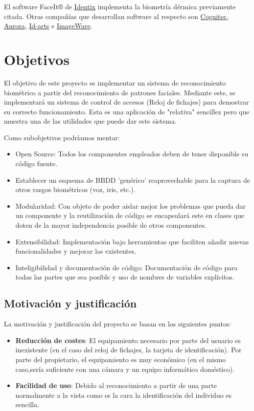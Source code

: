El software FaceIt® de \href{http://www.l1id.com/}{Identix} implementa la biometría dérmica previamente citada. Otras compañías que desarrollan software al respecto son \href{http://www.cognitec.com}{Cognitec}, \href{http://www.facerec.com/}{Aurora}, \href{http://www.id-arts.com/}{Id-arts} e \href{http://www.iwsinc.com}{ImageWare}.


\section {Objetivos}
El objetivo de este proyecto es implementar un sistema de reconocimiento biométrico a partir del reconocimiento de patrones faciales. Mediante este, se implementará un sistema de control de accesos (Reloj de fichajes) para demostrar su correcto funcionamiento. Esta es una aplicación de "relativa" sencillez pero que muestra una de las utilidades que puede dar este sistema. 

Como subobjetivos podríamos mentar:
\begin{itemize}
	\item{Open Source: Todos los componentes empleados deben de tener disponible su código fuente.}
	\item{Establecer un esquema de BBDD 'genérico' reaprovechable para la captura de otros rasgos biométricos (voz, iris, etc.). }
	\item{Modularidad: Con objeto de poder aislar mejor los problemas que pueda dar un componente y la reutilización de código se encapsulará este en clases que doten de la mayor independencia posible de otros componentes. }
	\item{Extensibilidad: Implementación bajo herramientas que faciliten añadir nuevas funcionalidades y mejorar las existentes. }
	\item{Inteligibilidad y documentación de código: Documentación de código para todas las partes que sea posible y uso de nombres de variables explícitos.}
\end{itemize}


\subsection{Motivación y justificación}
La motivación y justificación del proyecto se basan en los siguientes puntos:
\begin{itemize}
	\item{\textbf{Reducción de costes}:} El equipamiento necesario por parte del usuario es inexistente (en el caso del reloj de fichajes, la tarjeta de identificación). Por parte del propietario, el equipamiento es muy económico (en el mismo caso,sería suficiente con una cámara y un equipo informático doméstico).
	\item{\textbf{Facilidad de uso}:} Debido al reconocimiento a partir de una parte normalmente a la vista como es la cara la identificación del individuo es sencilla.
\end{itemize}

